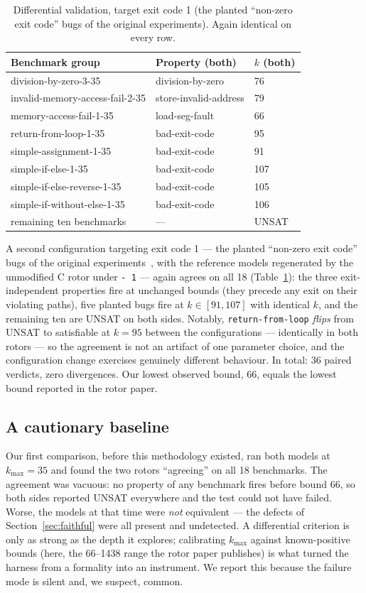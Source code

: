 \documentclass[sigplan,screen,nonacm]{acmart}
\begin{document}
\begin{table}[t]
\caption{Differential validation, target exit code 1 (the planted
``non-zero exit code'' bugs of the original experiments). Again
identical on every row.}
\label{tab:equiv1}
\centering
\footnotesize
\begin{tabular}{lll}
\toprule
Benchmark group & Property (both) & $k$ (both) \\
\midrule
division-by-zero-3-35 & division-by-zero & 76 \\
invalid-memory-access-fail-2-35 & store-invalid-address & 79 \\
memory-access-fail-1-35 & load-seg-fault & 66 \\
return-from-loop-1-35 & bad-exit-code & 95 \\
simple-assignment-1-35 & bad-exit-code & 91 \\
simple-if-else-1-35 & bad-exit-code & 107 \\
simple-if-else-reverse-1-35 & bad-exit-code & 105 \\
simple-if-without-else-1-35 & bad-exit-code & 106 \\
remaining ten benchmarks & --- & UNSAT \\
\bottomrule
\end{tabular}
\end{table}

A second configuration targeting exit code 1 --- the planted
``non-zero exit code'' bugs of the original
experiments~\cite{rotorpaper}, with the reference models regenerated by
the unmodified C rotor under \texttt{-~1} --- again agrees on all 18
(Table~\ref{tab:equiv1}): the three exit-independent properties fire at
unchanged bounds (they precede any exit on their violating paths), five
planted bugs fire at $k \in [91,107]$ with identical $k$, and the
remaining ten are UNSAT on both sides. Notably,
\texttt{return-from-loop} \emph{flips} from UNSAT to satisfiable at
$k{=}95$ between the configurations --- identically in both rotors ---
so the agreement is not an artifact of one parameter choice, and the
configuration change exercises genuinely different behaviour. In total:
36 paired verdicts, zero divergences. Our lowest observed bound, 66,
equals the lowest bound reported in the rotor paper.

\subsection{A cautionary baseline}
\label{sec:vacuous}

Our first comparison, before this methodology existed, ran both models
at $k_{\max}{=}35$ and found the two rotors ``agreeing'' on all 18
benchmarks. The agreement was vacuous: no property of any benchmark
fires before bound 66, so both sides reported UNSAT everywhere and the
test could not have failed. Worse, the models at that time were
\emph{not} equivalent --- the defects of Section~\ref{sec:faithful}
were all present and undetected. A differential criterion is only as
strong as the depth it explores; calibrating $k_{\max}$ against
known-positive bounds (here, the 66--1438 range the rotor paper
publishes) is what turned the harness from a formality into an
instrument. We report this because the failure mode is silent and, we
suspect, common.
\end{document}
